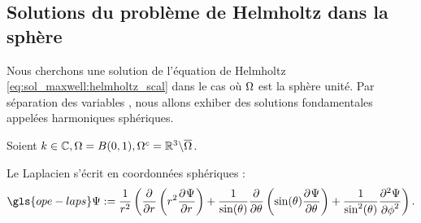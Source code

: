 \subsection{Solutions du problème de Helmholtz dans la sphère}
\label{sec:helmholtz_scal}

Nous cherchons une solution de l'équation de Helmholtz \eqref{eq:sol_maxwell:helmholtz_scal} dans le cas où \(\Omega\) est la sphère unité. Par séparation des variables%
, nous allons exhiber des solutions fondamentales appelées harmoniques sphériques.

Soient \(k \in \mathbb C, \Omega = B(0,1), \Omega^c = \mathbb R^3 \backslash \overline{\Omega}\).

Le Laplacien s'écrit en coordonnées sphériques :
\[
  \gls{ope-laps} \Psi := \frac{1}{r^2}\left(
  \ddr{r}{}\left(r^2\ddr{r}{\Psi}\right)
  + \frac{1}{\sin(\theta)}\ddr{\theta}{}\left(\sin(\theta)\ddr{\theta}{\Psi}\right)
  + \frac{1}{\sin^2(\theta)} \ddr[2]{\phi}{\Psi}\right).
\]

